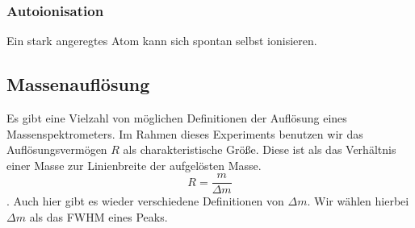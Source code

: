 \subsubsection{Autoionisation}
Ein stark angeregtes Atom kann sich spontan selbst ionisieren. 
\subsection{Massenauflösung}
Es gibt eine Vielzahl von möglichen Definitionen der Auflösung eines Massenspektrometers. Im Rahmen dieses Experiments benutzen wir das Auflösungsvermögen $R$ als charakteristische Größe. Diese ist als das Verhältnis einer Masse zur Linienbreite der aufgelösten Masse. $$R = \frac{m}{\Delta m}$$. Auch hier gibt es wieder verschiedene Definitionen von $\Delta m$. Wir wählen hierbei $\Delta m$ als das FWHM eines Peaks.